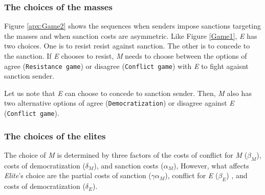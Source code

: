 \documentclass[11pt]{article}
\begin{document}
\subsubsection*{The choices of the masses}

Figure \ref{apx:Game2} shows the sequences when senders impose sanctions targeting the masses and when sanction costs are asymmetric. Like Figure \ref{Game1}, \textit{E} has two choices. One is to resist resist against sanction. The other is to concede to the sanction. If \textit{E} chooses to resist, \textit{M} needs to choose between the options of agree (\texttt{Resistance game}) or disagree (\texttt{Conflict game}) with \textit{E} to fight agaisnt sanction sender. 
	
Let us note that \textit{E} can choose to concede to sanction sender. Then, \textit{M} also has two alternative options of agree (\texttt{Democratization}) or disagree against \textit{E} (\texttt{Conflict game}).
	
\subsubsection*{The choices of the elites}

The choice of \textit{M} is determined by three factors of the costs of conflict for \textit{M} ($\beta_{M}$), costs of democratization ($\delta_{M}$), and sanction costs ($\alpha_{M}$), However, what affects \textit{Elite}'s choice are the partial costs of sanction ($\gamma\alpha_{M}$), conflict for \textit{E} ($\beta_{E}$)
, and costs of democratization ($\delta_{E}$).
\end{document}
